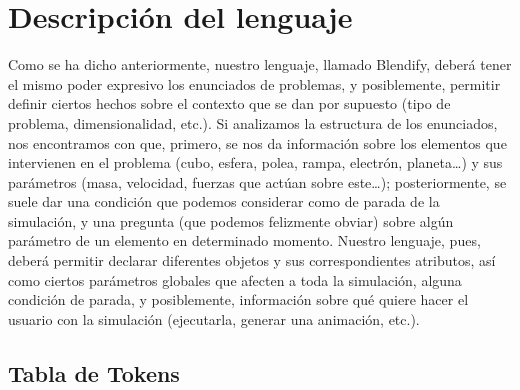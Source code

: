 \documentclass[12pt]{article}
\begin{document}
\section{Descripción del lenguaje}

Como se ha dicho anteriormente, nuestro lenguaje, llamado Blendify, deberá tener el mismo poder expresivo los enunciados de problemas, y posiblemente, permitir definir ciertos hechos sobre el contexto que se dan por supuesto (tipo de problema, dimensionalidad, etc.). Si analizamos la estructura de los enunciados, nos encontramos con que, primero, se nos da información sobre los elementos que intervienen en el problema (cubo, esfera, polea, rampa, electrón, planeta…) y sus parámetros (masa, velocidad, fuerzas que actúan sobre este…); posteriormente, se suele dar una condición que podemos considerar como de parada de la simulación, y una pregunta (que podemos felizmente obviar) sobre algún parámetro de un elemento en determinado momento. Nuestro lenguaje, pues, deberá permitir declarar diferentes objetos y sus correspondientes atributos, así como ciertos parámetros globales que afecten a toda la simulación, alguna condición de parada, y posiblemente, información sobre qué quiere hacer el usuario con la simulación (ejecutarla, generar una animación, etc.).

\subsection{Tabla de Tokens}
\end{document}

